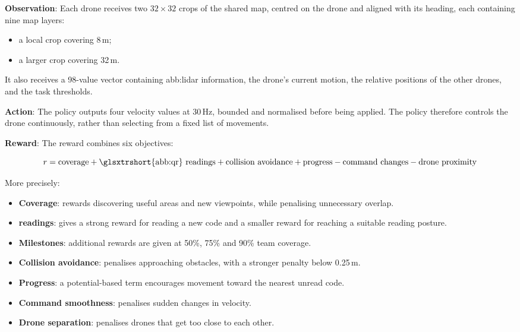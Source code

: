 \textbf{Observation}: Each drone receives two $32 \times 32$ crops of the shared
map, centred on the drone and aligned with its heading, each containing nine map
layers:

\begin{itemize}[itemsep=0.2em]
    \item a local crop covering 8\,m;
    \item a larger crop covering 32\,m.
\end{itemize}

It also receives a 98-value vector containing \gls{abb:lidar} information, the
drone's current motion, the relative positions of the other drones, and the task
thresholds.

\textbf{Action}: The policy outputs four velocity values at 30\,Hz, bounded and
normalised before being applied. The policy therefore controls the drone
continuously, rather than selecting from a fixed list of movements.

\textbf{Reward}: The reward combines six objectives:

\begin{equation}
    r = \text{coverage} + \text{\glsxtrshort{abb:qr} readings}
    + \text{collision avoidance} + \text{progress}
    - \text{command changes} - \text{drone proximity}
    \label{eq:impl:reward}
\end{equation}

More precisely:

\begin{itemize}[itemsep=0.3em]
    \item \textbf{Coverage}: rewards discovering useful areas and new viewpoints,
          while penalising unnecessary overlap.
    \item \textbf{ readings}: gives a strong reward for reading
          a new  code and a smaller reward for reaching a
          suitable reading posture.
    \item \textbf{Milestones}: additional rewards are given at 50\%, 75\% and 90\%
          team coverage.
    \item \textbf{Collision avoidance}: penalises approaching obstacles, with a
          stronger penalty below 0.25\,m.
    \item \textbf{Progress}: a potential-based term encourages movement toward the
          nearest unread code.
    \item \textbf{Command smoothness}: penalises sudden changes in velocity.
    \item \textbf{Drone separation}: penalises drones that get too close to each
          other.
\end{itemize}

